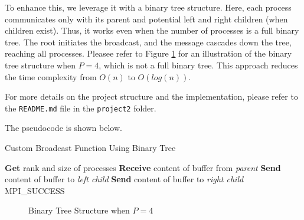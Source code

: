 \documentclass[12pt,a4paper]{article}
\begin{document}
To enhance this, 
we leverage it with a binary tree structure. 
Here, each process communicates only with its parent and potential left and right children (when children exist). 
Thus, it works even when the number of processes is a full binary tree.
The root initiates the broadcast, and the message cascades down the tree, reaching all processes.
Pleasee refer to Figure \ref{fig:binary_tree} for an illustration of the binary tree structure when $P = 4$,
which is not a full binary tree.
This approach reduces the time complexity from $O(n)$ to $O(log(n))$.

For more details on the project structure and the implementation, 
please refer to the \texttt{README.md} file in the \texttt{project2} folder.

The pseudocode is shown below.
\begin{algorithm}
    \caption{Custom Broadcast Function Using Binary Tree}
    \begin{algorithmic}[1]
    \State \textbf{Get} rank and size of processes
            \State \textbf{Receive} content of buffer from \textit{parent} 
        \EndIf
            \State \textbf{Send} content of buffer to \textit{left child} 
        \EndIf
            \State \textbf{Send} content of buffer to \textit{right child} 
        \EndIf
        \State \Return MPI\_SUCCESS
    \EndProcedure
    \end{algorithmic}
\end{algorithm}

\begin{figure}
    \centering
    \caption{Binary Tree Structure when $P = 4$}
    \label{fig:binary_tree}
\end{figure}
  
\end{document}
